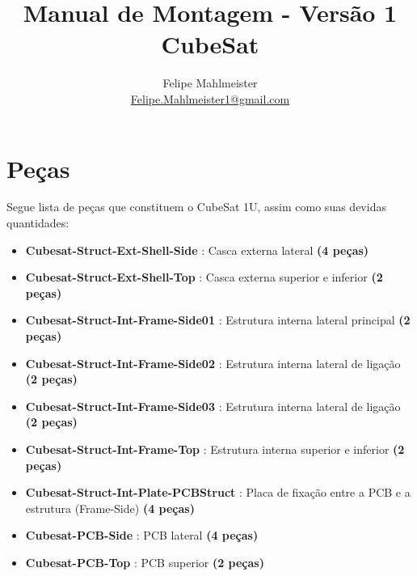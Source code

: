 %  		



\usepackage{lettrine}
\usepackage{enumitem}





\subject{BrasCubo}
\title{Manual de Montagem - Versão 1\\ CubeSat}
\author{Felipe Mahlmeister \\ \small \href{mailto:Felipe.Mahlmeister1@gmail.com}{Felipe.Mahlmeister1@gmail.com}}
\lowertitleback{}




\maketitle
\tableofcontents



\section{Peças}

Segue lista de peças que constituem o CubeSat 1U, assim como suas devidas quantidades:

\begin{itemize}
	\item \textbf{Cubesat-Struct-Ext-Shell-Side} : Casca externa lateral \textbf{(4 peças)}
	\item \textbf{Cubesat-Struct-Ext-Shell-Top} : Casca externa superior e inferior \textbf{(2 peças)}
	\item \textbf{Cubesat-Struct-Int-Frame-Side01} : Estrutura interna lateral principal \textbf{(2 peças)}
	\item \textbf{Cubesat-Struct-Int-Frame-Side02} : Estrutura interna lateral de ligação \textbf{(2 peças)}
	\item \textbf{Cubesat-Struct-Int-Frame-Side03} : Estrutura interna lateral de ligação \textbf{(2 peças)}
	\item \textbf{Cubesat-Struct-Int-Frame-Top} : Estrutura interna superior e inferior \textbf{(2 peças)}
	\item \textbf{Cubesat-Struct-Int-Plate-PCBStruct} : Placa de fixação entre a PCB e a estrutura (Frame-Side) \textbf{(4 peças)}
	\item \textbf{Cubesat-PCB-Side} : PCB lateral \textbf{(4 peças)}
	\item \textbf{Cubesat-PCB-Top} : PCB superior \textbf{(2 peças)}
\end{itemize}

